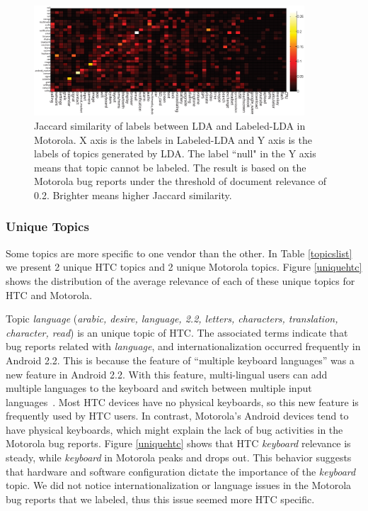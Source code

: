\documentclass[10pt, conference, compsocconf]{IEEEtran}
\begin{document}
\begin{figure}
\centering
\includegraphics[width=0.9\textwidth]{motosim.eps}
\caption{Jaccard similarity of labels between LDA and Labeled-LDA in Motorola. X axis is the labels in Labeled-LDA and Y axis is the labels of topics generated by LDA. The label ``null" in the Y axis means that topic cannot be labeled. The result is based on the Motorola bug reports under the threshold of document relevance of 0.2. Brighter means higher Jaccard similarity.}
\label{similaritymoto}
\end{figure}


\subsubsection{Unique Topics}

Some topics are more specific to one vendor than the other.
In Table \ref{topicslist} we present 2 unique HTC topics and 2 unique
Motorola topics. Figure \ref{uniquehtc} shows the distribution of the
average relevance of each of these unique topics for HTC and Motorola.


Topic \textit{language} (\textit{arabic, desire, language, 2.2, letters,
  characters, translation, character, read}) is an unique topic of
HTC. The associated terms indicate that bug reports related with
\textit{language}, and internationalization occurred frequently in
Android 2.2. 
This is because the feature of ``multiple keyboard languages'' was a new
feature in Android 2.2. With this feature, multi-lingual users can add
multiple languages to the keyboard and switch between multiple
input languages~\cite{androidwebsite}. Most
HTC devices have no physical keyboards, so this new feature is 
frequently used by HTC users. In contrast, Motorola's Android devices tend
to  have physical keyboards, which might explain the lack of bug activities
in the  Motorola bug reports.
Figure \ref{uniquehtc} shows that
HTC \textit{keyboard} relevance is steady, while \textit{keyboard} in
Motorola peaks and drops out. This behavior suggests that hardware
and software configuration dictate the importance of the \emph{keyboard}
topic.
We did not notice internationalization or language issues in the
Motorola bug reports that we labeled, thus this issue seemed more HTC
specific.
\end{document}
